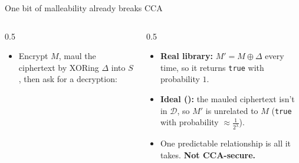 \ifdefined\PRESENTATION\else\PassOptionsToClass{handout}{beamer}\fi\documentclass[aspectratio=169, lualatex]{beamer}
\begin{document}
\begin{frame}{One bit of malleability already breaks CCA}
	\begin{columns}[c]
		\begin{column}{0.5\textwidth}
			\begin{itemize}
				\item Encrypt $M$, maul the ciphertext by XORing $\Delta$ into $S$, then ask for a decryption:
			\end{itemize}
		\end{column}
		\begin{column}{0.5\textwidth}
			\begin{itemize}
				\item \textbf{Real library:} $M' = M \oplus \Delta$ every time, so it returns \texttt{true} with probability $1$.
				\item \textbf{Ideal ():} the mauled ciphertext isn't in $\mathcal{D}$, so $M'$ is unrelated to $M$ (\texttt{true} with probability $\approx \frac{1}{2^\lambda}$).
				\item One predictable relationship is all it takes. \textbf{Not CCA-secure.}
			\end{itemize}
		\end{column}
	\end{columns}
\end{frame}
\end{document}
